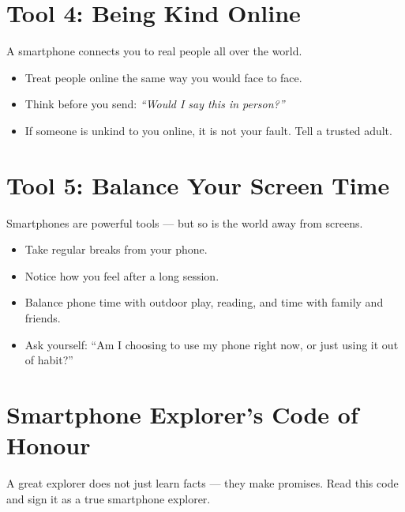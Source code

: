 \sectionrule

\section*{Tool 4: Being Kind Online}

A smartphone connects you to real people all over the world.
\begin{itemize}
  \item Treat people online the same way you would face to face.
  \item Think before you send: \emph{``Would I say this in person?''}
  \item If someone is unkind to you online, it is not your fault. Tell a trusted adult.
\end{itemize}


\sectionrule

\section*{Tool 5: Balance Your Screen Time}

Smartphones are powerful tools — but so is the world away from screens.
\begin{itemize}
  \item Take regular breaks from your phone.
  \item Notice how you feel after a long session.
  \item Balance phone time with outdoor play, reading, and time with family and friends.
  \item Ask yourself: ``Am I choosing to use my phone right now, or just using it out of habit?''
\end{itemize}

\sectionrule

\section*{Smartphone Explorer's Code of Honour}

\begin{picturethis}
  A great explorer does not just learn facts — they make promises.
  Read this code and sign it as a true smartphone explorer.
\end{picturethis}

